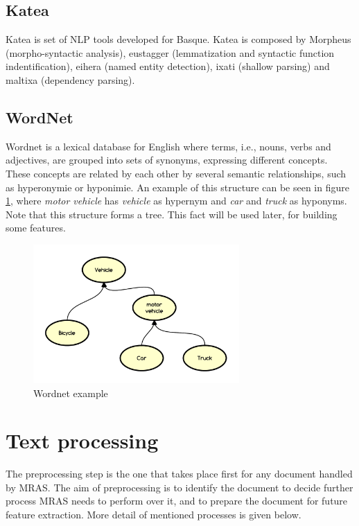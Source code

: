 \documentclass{bsu-ms}
\newcommand{\projectName}{MRAS\xspace}
\begin{document}
\subsection*{Katea}
Katea is set of NLP tools developed for Basque. Katea is composed by Morpheus \cite{morpheus} (morpho-syntactic analysis), eustagger \cite{eustagger} (lemmatization and syntactic function indentification), eihera \cite{eihera} (named entity detection), ixati \cite{morpheus} (shallow parsing) and maltixa \cite{maltixa} (dependency parsing).






\subsection{WordNet}
Wordnet \cite{miller1995wordnet} is a lexical database for English where terms, i.e., nouns, verbs and adjectives, are grouped into sets of synonyms, expressing different concepts. These concepts are related by each other by several semantic relationships, such as hyperonymie or hyponimie. An example of this structure can be seen in figure \ref{fig:wordnet}, where \emph{motor vehicle} has \emph{vehicle} as hypernym and \emph{car} and \emph{truck} as hyponyms. Note that this structure forms a tree. This fact will be used later, for building some features.




\begin{figure}[h!]
\centering
\includegraphics[width=0.7\textwidth]{wordnet}
\caption{Wordnet example}
\label{fig:wordnet}
\end{figure}






\section{Text processing}
\label{sec:textprocessing}
The preprocessing step is the one that takes place first for any document handled by \projectName . The aim of preprocessing is to identify the document to decide further process \projectName needs to perform over it, and to prepare the document for future feature extraction. More detail of mentioned processes is given below.
\end{document}
